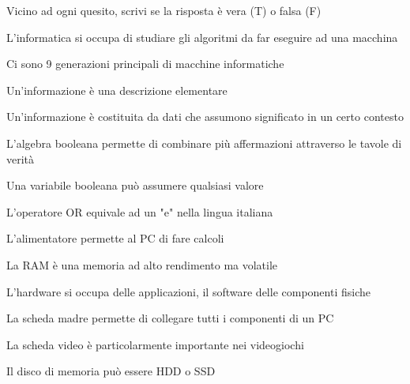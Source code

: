 \documentclass[addpoints]{exam}
\newcommand{\tf}[1][{}]{%
	\fillin[#1][0.25in]%
}
\begin{document}
 
\begin{center}
\end{center}

\vspace{5mm}

 
\vspace{10mm}

Vicino ad ogni quesito, scrivi se la risposta è vera (T) o falsa (F)
\begin{multicols}{2}
	
\begin{questions} 

\question[1] \tf[T] L'informatica si occupa di studiare gli algoritmi da far eseguire ad una macchina

\question[1] \tf[F] Ci sono 9 generazioni principali di macchine informatiche

\question[1] \tf[F] Un'informazione è una descrizione elementare

\question[1] \tf[T] Un'informazione è costituita da dati che assumono significato in un certo contesto

\question[1] \tf[T] L'algebra booleana permette di combinare più affermazioni attraverso le tavole di verità

\question[1] \tf[F] Una variabile booleana può assumere qualsiasi valore

\question[1] \tf[T] L'operatore OR equivale ad un "e" nella lingua italiana

\question[1] \tf[F] L'alimentatore permette al PC di fare calcoli

\question[1] \tf[T] La RAM è una memoria ad alto rendimento ma volatile

\question[1] \tf[F] L'hardware si occupa delle applicazioni, il software delle componenti fisiche

\question[1] \tf[T] La scheda madre permette di collegare tutti i componenti di un PC

\question[1] \tf[T] La scheda video è particolarmente importante nei videogiochi

\question[1] \tf[T] Il disco di memoria può essere HDD o SSD


\end{questions}
\end{multicols}
\end{document}
